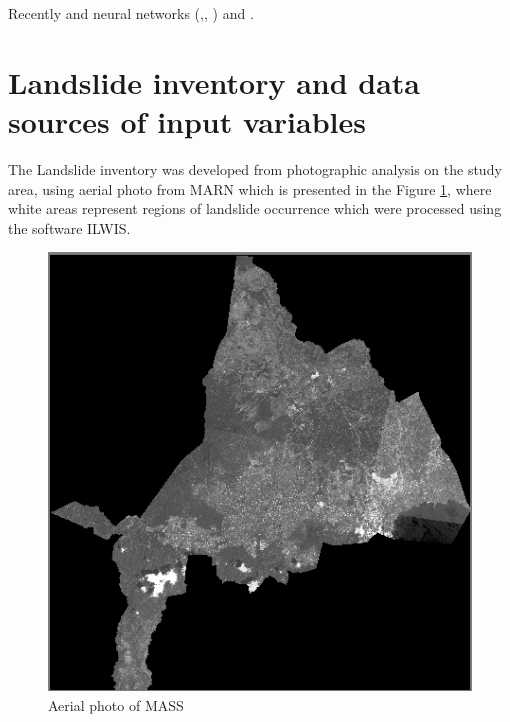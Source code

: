 \documentclass[11pt,twoside]{rmta2010esp}%
\begin{document}
Recently 
and neural networks (\cite{Melchiorre2011410},\cite{Zeng2001374}, \cite{Ermini2005327}) and \cite{Yesilnacar2005251}.







\section{Landslide inventory and data sources of input variables}
\label{sec:landsinvet}
The Landslide inventory was developed from photographic analysis on the study area, using 
aerial photo from MARN which is presented in the Figure \ref{fig:img01}, where white areas represent regions of landslide occurrence which were processed using the software ILWIS. 

 \begin{center}
  \begin{figure}[H]
   \centering
   \includegraphics[scale=0.40]{img01}
   \caption{\small{Aerial photo of MASS}}
   \label{fig:img01}
  \end{figure}
 \end{center}
\end{document}
